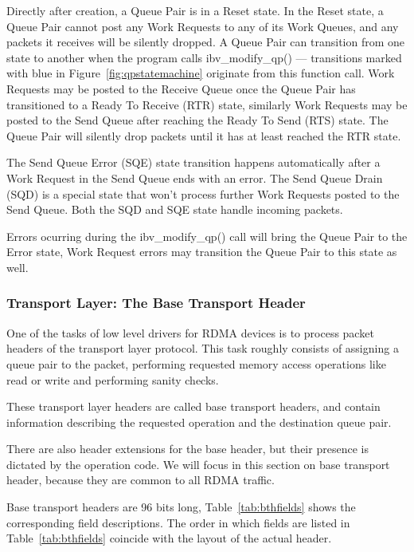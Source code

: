 Directly after creation, a Queue Pair is in a Reset state. In the Reset state,
a Queue Pair cannot post any Work Requests to any
of its Work Queues, and any packets it receives will be silently dropped.
A Queue Pair can transition from one state to another when the program calls ibv\_modify\_qp() ---
transitions marked with blue in Figure~\ref{fig:qpstatemachine} originate from this function call.
Work Requests may be posted to the Receive Queue once the Queue Pair has transitioned to a Ready To Receive (RTR) state,
similarly Work Requests may be posted to the Send Queue after reaching the Ready To Send (RTS) state. The Queue Pair will silently drop
packets until it has at least reached the RTR state.

The Send Queue Error (SQE) state transition happens automatically
after a Work Request in the Send Queue ends with an error\cite{QPStateMachine2012}. The Send Queue Drain (SQD) is a special state
that won't process further Work Requests posted to the Send Queue\cite{QPStateMachine2012}. Both the SQD and SQE state handle incoming packets\cite{barakVerbsProgrammingTutorial2014}.

Errors ocurring during the ibv\_modify\_qp() call will bring the Queue Pair
to the Error state, Work Request errors may transition the Queue Pair to this state as well\cite{QPStateMachine2012}.

\subsubsection{Transport Layer: The Base Transport Header}

One of the tasks of low level drivers for RDMA devices is to process
packet headers of the transport layer protocol. This task roughly consists
of assigning a queue pair to the packet, performing requested memory access operations like
read or write and performing sanity checks.

These transport layer headers are called
base transport headers, and contain information describing the
requested operation and the  destination queue pair.

There are also header extensions for the base header, but their presence is dictated
by the operation code. We will focus in this section on base transport header,
because they are common to all RDMA traffic.

Base transport headers are 96 bits long, Table~\ref{tab:bthfields} shows the corresponding field descriptions. The order in which fields
are listed in Table~\ref{tab:bthfields} coincide with the layout of the actual header.

